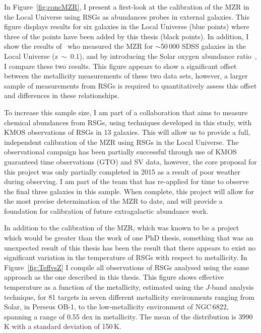 In Figure~\ref{fig:concMZR}, I present a first-look at the calibration of the MZR in the Local Universe using RSGs as abundances probes in external galaxies.
This figure displays results for six galaxies in the Local Universe (blue points) where three of the points have been added by this thesis (black points).
In addition, I show the results of~\cite{Tremonti04} who measured the MZR for $\sim$50\,000 SDSS galaxies in the Local Universe (z~$\sim$~0.1), and by introducing the Solar oxygen abundance ratio~\citep[12 + $\log$ (O/H)$_{\odot}$~=~8.69][]{2009ARA&A..47..481A}, I compare these two results.
This figure appears to show a significant offset between the metallicity measurements of these two data sets, however, a larger sample of measurements from RSGs is required to quantitatively assess this offset and differences in these relationships.


To increase this sample size, I am part of a collaboration that aims to measure chemical abundances from RSGs, using techniques developed in this study, with KMOS observations of RSGs in 13 galaxies.
This will allow us to provide a full, independent calibration of the MZR using RSGs in the Local Universe.
The observational campaign has been partially successful through use of KMOS guaranteed time observations (GTO) and SV data, however, the core proposal for this project was only partially completed in 2015 as a result of poor weather during observing.
I am part of the team that has re-applied for time to observe the final three galaxies in this sample.
When complete, this project will allow for the most precise determination of the MZR to date, and will provide a foundation for calibration of future extragalactic abundance work.


In addition to the calibration of the MZR, which was known to be a project which would be greater than the work of one PhD thesis, something that was an unexpected result of this thesis has been the result that there appears to exist no significant variation in the temperature of RSGs with respect to metallicity.
In Figure~\ref{fig:TeffvsZ} I compile all observations of RSGs analysed using the same approach as the one described in this thesis.
This figure shows effective temperature as a function of the metallicity, estimated using the $J$-band analysis technique, for 81 targets in seven different metallicity environments ranging from Solar, in Perseus OB-1, to the low-metallicity environment of NGC\,6822, spanning a range of 0.55 dex in metallicity.
The mean of the distribution is 3990\,K with a standard deviation of 150\,K.


